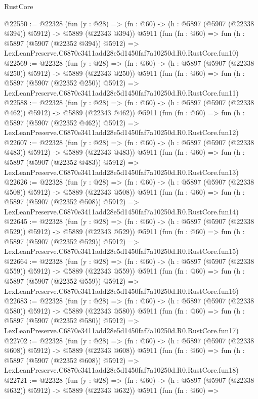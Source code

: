 \begin{lexlean}{RustCore}
\begin{coremodule}
@22550 := @22328
    (fun (y : @28) => (fn : @60) -> (h : @5897 (@5907 (@22338 @394)) @5912) -> @5889 (@22343 @394))
    @5911
    (fun (fn : @60) =>
    fun (h : @5897 (@5907 (@22352 @394)) @5912) =>
    LexLeanPreserve.C6870e3411add28e5d1450faf7a10250d.R0.RustCore.fun10)
@22569 := @22328
    (fun (y : @28) => (fn : @60) -> (h : @5897 (@5907 (@22338 @250)) @5912) -> @5889 (@22343 @250))
    @5911
    (fun (fn : @60) =>
    fun (h : @5897 (@5907 (@22352 @250)) @5912) =>
    LexLeanPreserve.C6870e3411add28e5d1450faf7a10250d.R0.RustCore.fun11)
@22588 := @22328
    (fun (y : @28) => (fn : @60) -> (h : @5897 (@5907 (@22338 @462)) @5912) -> @5889 (@22343 @462))
    @5911
    (fun (fn : @60) =>
    fun (h : @5897 (@5907 (@22352 @462)) @5912) =>
    LexLeanPreserve.C6870e3411add28e5d1450faf7a10250d.R0.RustCore.fun12)
@22607 := @22328
    (fun (y : @28) => (fn : @60) -> (h : @5897 (@5907 (@22338 @483)) @5912) -> @5889 (@22343 @483))
    @5911
    (fun (fn : @60) =>
    fun (h : @5897 (@5907 (@22352 @483)) @5912) =>
    LexLeanPreserve.C6870e3411add28e5d1450faf7a10250d.R0.RustCore.fun13)
@22626 := @22328
    (fun (y : @28) => (fn : @60) -> (h : @5897 (@5907 (@22338 @508)) @5912) -> @5889 (@22343 @508))
    @5911
    (fun (fn : @60) =>
    fun (h : @5897 (@5907 (@22352 @508)) @5912) =>
    LexLeanPreserve.C6870e3411add28e5d1450faf7a10250d.R0.RustCore.fun14)
@22645 := @22328
    (fun (y : @28) => (fn : @60) -> (h : @5897 (@5907 (@22338 @529)) @5912) -> @5889 (@22343 @529))
    @5911
    (fun (fn : @60) =>
    fun (h : @5897 (@5907 (@22352 @529)) @5912) =>
    LexLeanPreserve.C6870e3411add28e5d1450faf7a10250d.R0.RustCore.fun15)
@22664 := @22328
    (fun (y : @28) => (fn : @60) -> (h : @5897 (@5907 (@22338 @559)) @5912) -> @5889 (@22343 @559))
    @5911
    (fun (fn : @60) =>
    fun (h : @5897 (@5907 (@22352 @559)) @5912) =>
    LexLeanPreserve.C6870e3411add28e5d1450faf7a10250d.R0.RustCore.fun16)
@22683 := @22328
    (fun (y : @28) => (fn : @60) -> (h : @5897 (@5907 (@22338 @580)) @5912) -> @5889 (@22343 @580))
    @5911
    (fun (fn : @60) =>
    fun (h : @5897 (@5907 (@22352 @580)) @5912) =>
    LexLeanPreserve.C6870e3411add28e5d1450faf7a10250d.R0.RustCore.fun17)
@22702 := @22328
    (fun (y : @28) => (fn : @60) -> (h : @5897 (@5907 (@22338 @608)) @5912) -> @5889 (@22343 @608))
    @5911
    (fun (fn : @60) =>
    fun (h : @5897 (@5907 (@22352 @608)) @5912) =>
    LexLeanPreserve.C6870e3411add28e5d1450faf7a10250d.R0.RustCore.fun18)
@22721 := @22328
    (fun (y : @28) => (fn : @60) -> (h : @5897 (@5907 (@22338 @632)) @5912) -> @5889 (@22343 @632))
    @5911
    (fun (fn : @60) =>

\end{coremodule}
\end{lexlean}
